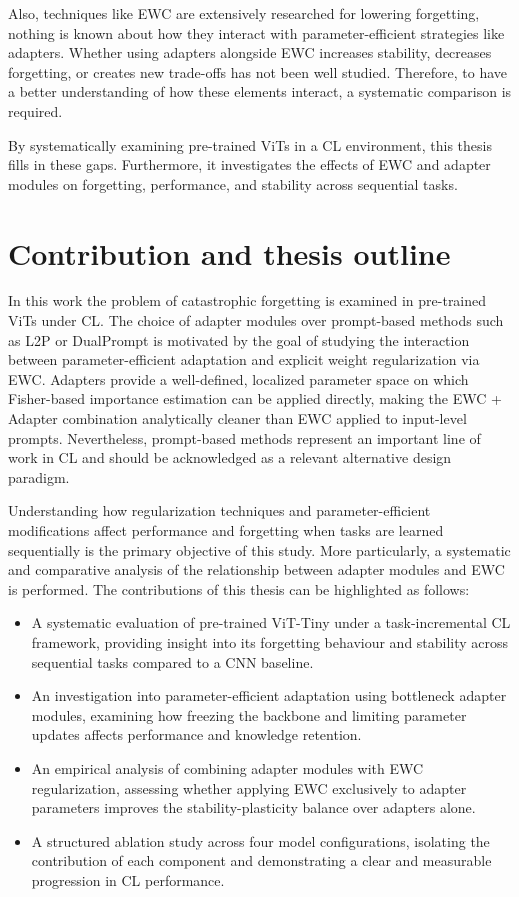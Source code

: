 \documentclass[english, LaM, oneside]{sapthesis}%
\numberwithin{equation}{chapter}
\begin{document}
Also, techniques like EWC are extensively researched for lowering forgetting, nothing is known about how they interact with parameter-efficient strategies like adapters. Whether using adapters alongside EWC increases stability, decreases forgetting, or creates new trade-offs has not been well studied. Therefore, to have a better understanding of how these elements interact, a systematic comparison is required.

By systematically examining pre-trained ViTs in a CL environment, this thesis fills in these gaps. Furthermore, it investigates the effects of EWC and adapter modules on forgetting, performance, and stability across sequential tasks.

\section{Contribution and thesis outline}
\label{sec:1.3}
In this work the problem of catastrophic forgetting is examined in pre-trained ViTs under CL. The choice of adapter modules over prompt-based methods such as L2P\cite{5} or DualPrompt\cite{41} is motivated by the goal of studying the interaction between parameter-efficient adaptation and explicit weight regularization via EWC. Adapters provide a well-defined, localized parameter space on which Fisher-based importance estimation can be applied directly, making the EWC + Adapter combination analytically cleaner than EWC applied to input-level prompts. Nevertheless, prompt-based methods represent an important line of work in CL and should be acknowledged as a relevant alternative design paradigm. 

Understanding how regularization techniques and parameter-efficient modifications affect performance and forgetting when tasks are learned sequentially is the primary objective of this study. More particularly, a systematic and comparative analysis of the relationship between adapter modules and EWC is performed.
The contributions of this thesis can be highlighted as follows:
\begin{itemize}
    \item A systematic evaluation of pre-trained ViT-Tiny under a task-incremental CL framework, providing insight into its forgetting behaviour and stability across sequential tasks compared to a CNN baseline.
    \item An investigation into parameter-efficient adaptation using bottleneck adapter modules, examining how freezing the backbone and limiting parameter updates affects performance and knowledge retention.
    \item An empirical analysis of combining adapter modules with EWC regularization, assessing whether applying EWC exclusively to adapter parameters improves the stability-plasticity balance over adapters alone.
    \item A structured ablation study across four model configurations, isolating the contribution of each component and demonstrating a clear and measurable progression in CL performance.
\end{itemize}
\end{document}
